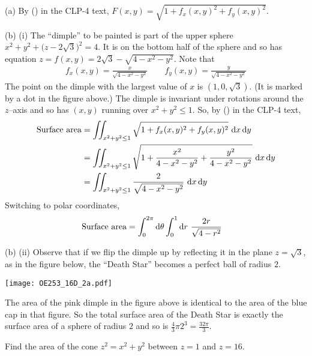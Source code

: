 \begin{solution}
(a)
By () in the CLP-4 text,
$F(x,y) = \sqrt{1+f_x(x,y)^2+f_y(x,y)^2}$.

(b)  (i) The ``dimple'' to be painted is part of the upper sphere
$x^2+y^2+\big(z-2\sqrt{3}\big)^2=4$. It is on the bottom half of the sphere
and so has equation $z=f(x,y)=2\sqrt{3}-\sqrt{4-x^2-y^2}$. Note that
\begin{align*}
f_x(x,y) = \frac{x}{\sqrt{4-x^2-y^2}}\qquad
f_y(x,y) = \frac{y}{\sqrt{4-x^2-y^2}}
\end{align*}
The point on the dimple with the largest value of $x$ is
$(1,0,\sqrt{3})$. (It is marked by a dot in the figure above.) The dimple
is invariant under rotations around the $z$--axis and so has $(x,y)$
running over $x^2+y^2\le 1$. So, by 
() in the CLP-4 text,
\begin{align*}
\text{Surface area}
&= \dblInt_{x^2+y^2\le 1}\sqrt{1+f_x(x,y)^2+f_y(x,y)^2}\ \dee{x}\,\dee{y} \\
&= \dblInt_{x^2+y^2\le 1}\sqrt{1+\frac{x^2}{4-x^2-y^2}
                                +\frac{y^2}{4-x^2-y^2}}\ \dee{x}\,\dee{y} \\
&= \dblInt_{x^2+y^2\le 1}\frac{2}{\sqrt{4-x^2-y^2}}\ \dee{x}\,\dee{y} 
\end{align*}
Switching to polar coordinates,
\begin{align*}
\text{Surface area}
&= \int_0^{2\pi}\mathrm{d}\theta\int_0^1\mathrm{d}r\ \frac{2r}{\sqrt{4-r^2}}
\end{align*}

(b) (ii) Observe that if we flip the dimple up by reflecting it
in the plane $z=\sqrt{3}$, as in the figure below, the ``Death Star'' 
becomes a perfect ball of radius $2$.  
\begin{center}
     \texttt{[image: OE253\_16D\_2a.pdf]}
\end{center}
The area of the pink dimple in the figure above is identical to the area
of the blue cap in that figure. So the total surface area of the 
Death Star is exactly the surface area of a sphere of radius $2$ and so
is $\frac{4}{3}\pi 2^3=\frac{32\pi}{3}$.

\end{solution}

\begin{question} [M200 2003A] %
Find the area of the cone $z^2=x^2+y^2$ between $z=1$ and $z=16$.
\end{question}

